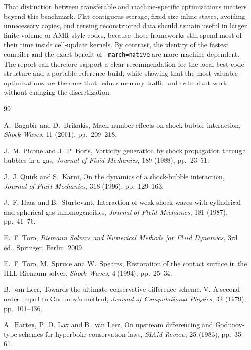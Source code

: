 \documentclass[final,3p,times,twocolumn]{elsarticle}
\begin{document}
That distinction between transferable and machine-specific optimizations matters beyond this benchmark. Flat contiguous storage, fixed-size inline states, avoiding unnecessary copies, and reusing reconstructed data should remain useful in larger finite-volume or AMR-style codes, because those frameworks still spend most of their time inside cell-update kernels. By contrast, the identity of the fastest compiler and the exact benefit of \texttt{-march=native} are more machine-dependent. The report can therefore support a clear recommendation for the local best code structure and a portable reference build, while showing that the most valuable optimizations are the ones that reduce memory traffic and redundant work without changing the discretization.

\begin{thebibliography}{99}

A.~Bagabir and D.~Drikakis,
Mach number effects on shock-bubble interaction,
\emph{Shock Waves}, 11 (2001), pp.~209--218.

J.~M. Picone and J.~P. Boris,
Vorticity generation by shock propagation through bubbles in a gas,
\emph{Journal of Fluid Mechanics}, 189 (1988), pp.~23--51.

J.~J. Quirk and S.~Karni,
On the dynamics of a shock-bubble interaction,
\emph{Journal of Fluid Mechanics}, 318 (1996), pp.~129--163.

J.~F. Haas and B.~Sturtevant,
Interaction of weak shock waves with cylindrical and spherical gas inhomogeneities,
\emph{Journal of Fluid Mechanics}, 181 (1987), pp.~41--76.

E.~F. Toro,
\emph{Riemann Solvers and Numerical Methods for Fluid Dynamics},
3rd ed., Springer, Berlin, 2009.

E.~F. Toro, M.~Spruce and W.~Speares,
Restoration of the contact surface in the HLL-Riemann solver,
\emph{Shock Waves}, 4 (1994), pp.~25--34.

B.~van Leer,
Towards the ultimate conservative difference scheme. V. A second-order sequel to Godunov's method,
\emph{Journal of Computational Physics}, 32 (1979), pp.~101--136.

A.~Harten, P.~D. Lax and B.~van Leer,
On upstream differencing and Godunov-type schemes for hyperbolic conservation laws,
\emph{SIAM Review}, 25 (1983), pp.~35--61.

\end{thebibliography}
\end{document}
